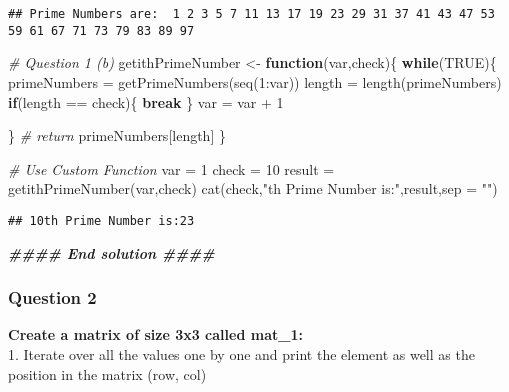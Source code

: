 \documentclass[
]{article}
\newenvironment{Shaded}{\begin{snugshade}}{\end{snugshade}}
\newcommand{\AttributeTok}[1]{\textcolor[rgb]{0.77,0.63,0.00}{#1}}
\newcommand{\CommentTok}[1]{\textcolor[rgb]{0.56,0.35,0.01}{\textit{#1}}}
\newcommand{\ConstantTok}[1]{\textcolor[rgb]{0.00,0.00,0.00}{#1}}
\newcommand{\ControlFlowTok}[1]{\textcolor[rgb]{0.13,0.29,0.53}{\textbf{#1}}}
\newcommand{\DecValTok}[1]{\textcolor[rgb]{0.00,0.00,0.81}{#1}}
\newcommand{\DocumentationTok}[1]{\textcolor[rgb]{0.56,0.35,0.01}{\textbf{\textit{#1}}}}
\newcommand{\FunctionTok}[1]{\textcolor[rgb]{0.00,0.00,0.00}{#1}}
\newcommand{\NormalTok}[1]{#1}
\newcommand{\OtherTok}[1]{\textcolor[rgb]{0.56,0.35,0.01}{#1}}
\newcommand{\SpecialCharTok}[1]{\textcolor[rgb]{0.00,0.00,0.00}{#1}}
\newcommand{\StringTok}[1]{\textcolor[rgb]{0.31,0.60,0.02}{#1}}
\begin{document}
\begin{verbatim}
## Prime Numbers are:  1 2 3 5 7 11 13 17 19 23 29 31 37 41 43 47 53 59 61 67 71 73 79 83 89 97
\end{verbatim}

\begin{Shaded}
\begin{Highlighting}[]
\CommentTok{\# Question 1 (b)}
\NormalTok{getithPrimeNumber }\OtherTok{\textless{}{-}} \ControlFlowTok{function}\NormalTok{(var,check)\{}
     \ControlFlowTok{while}\NormalTok{(}\ConstantTok{TRUE}\NormalTok{)\{}
\NormalTok{          primeNumbers }\OtherTok{=} \FunctionTok{getPrimeNumbers}\NormalTok{(}\FunctionTok{seq}\NormalTok{(}\DecValTok{1}\SpecialCharTok{:}\NormalTok{var))}
\NormalTok{          length }\OtherTok{=} \FunctionTok{length}\NormalTok{(primeNumbers)}
          \ControlFlowTok{if}\NormalTok{(length }\SpecialCharTok{==}\NormalTok{ check)\{}
               \ControlFlowTok{break}
\NormalTok{          \}}
\NormalTok{          var }\OtherTok{=}\NormalTok{ var }\SpecialCharTok{+} \DecValTok{1}
     
\NormalTok{     \}}
     \CommentTok{\# return }
\NormalTok{     primeNumbers[length]}
\NormalTok{\}}

\CommentTok{\# Use Custom Function}
\NormalTok{var }\OtherTok{=} \DecValTok{1}
\NormalTok{check }\OtherTok{=} \DecValTok{10}
\NormalTok{result }\OtherTok{=} \FunctionTok{getithPrimeNumber}\NormalTok{(var,check)}
\FunctionTok{cat}\NormalTok{(check,}\StringTok{"th Prime Number is:"}\NormalTok{,result,}\AttributeTok{sep =} \StringTok{""}\NormalTok{)}
\end{Highlighting}
\end{Shaded}

\begin{verbatim}
## 10th Prime Number is:23
\end{verbatim}

\begin{Shaded}
\begin{Highlighting}[]
\DocumentationTok{\#\#\#\# End solution \#\#\#\#}
\end{Highlighting}
\end{Shaded}

\hypertarget{question-2-1}{%
\subsubsection{Question 2}\label{question-2-1}}

\textbf{Create a matrix of size 3x3 called mat\_1:}\\
1. Iterate over all the values one by one and print the element as well
as the position in the matrix (row, col)
\end{document}
